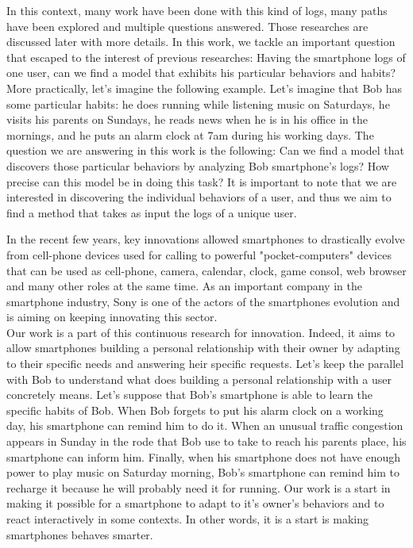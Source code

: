 In this context, many work have been done with this kind of logs, many paths have been explored and multiple questions answered. Those researches are discussed later with more details.
In this work, we tackle an important question that escaped to the interest of previous researches: Having the smartphone logs of one user, can we find a model that exhibits his particular behaviors and habits? More practically, let's imagine the following example. Let's imagine that Bob has some particular habits: he does running while listening music on Saturdays, he visits his parents on Sundays, he reads news when he is in his office in the mornings, and he puts an alarm clock at 7am during his working days. The question we are answering in this work is the following: Can we find a model that discovers those particular behaviors by analyzing Bob smartphone's logs? How precise can this model be in doing this task?
It is important to note that we are interested in discovering the individual behaviors of a user, and thus we aim to find a method that takes as input the logs of a unique user. \par

In the recent few years, key innovations allowed smartphones to drastically evolve from cell-phone devices used for calling to powerful "pocket-computers" devices that can be used as cell-phone, camera, calendar, clock, game consol, web browser and many other roles at the same time. As an important company in the smartphone industry, Sony is one of the actors of the smartphones evolution and is aiming on keeping innovating this sector. 
\\Our work is a part of this continuous research for innovation. Indeed, it aims to allow smartphones building a personal relationship with their owner by adapting to their specific needs and answering heir specific requests. Let's keep the parallel with Bob to understand what does building a personal relationship with a user concretely means. Let's suppose that Bob's smartphone is able to learn the specific habits of Bob. When Bob forgets to put his alarm clock on a working day, his smartphone can remind him to do it. When an unusual traffic congestion appears in Sunday in the rode that Bob use to take to reach his parents place, his smartphone can inform him. Finally, when his smartphone does not have enough power to play music on Saturday morning, Bob's smartphone can remind him to recharge it because he will probably need it for running. Our work is a start in making it possible for a smartphone to adapt to it's owner's behaviors and to react interactively in some contexts. In other words, it is a start is making smartphones behaves smarter. \par

